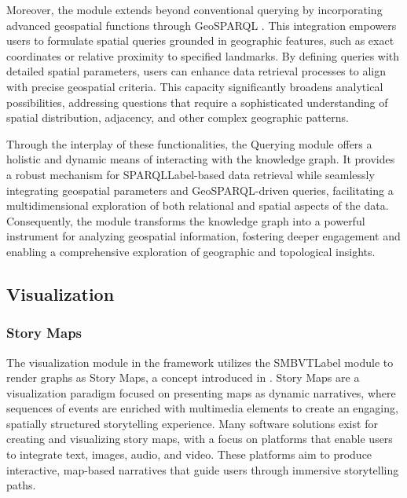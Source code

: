 Moreover, the module extends beyond conventional querying by incorporating advanced geospatial functions through GeoSPARQL \cite{matthewperryOGCGeoSPARQLGeographic2012}. This integration empowers users to formulate spatial queries grounded in geographic features, such as exact coordinates or relative proximity to specified landmarks. By defining queries with detailed spatial parameters, users can enhance data retrieval processes to align with precise geospatial criteria. This capacity significantly broadens analytical possibilities, addressing questions that require a sophisticated understanding of spatial distribution, adjacency, and other complex geographic patterns.

Through the interplay of these functionalities, the Querying module offers a holistic and dynamic means of interacting with the knowledge graph. It provides a robust mechanism for \acrshort{SPARQLLabel}-based data retrieval while seamlessly integrating geospatial parameters and GeoSPARQL-driven queries, facilitating a multidimensional exploration of both relational and spatial aspects of the data. Consequently, the module transforms the knowledge graph into a powerful instrument for analyzing geospatial information, fostering deeper engagement and enabling a comprehensive exploration of geographic and topological insights.


\subsection{Visualization}\label{VI-subsec:visualization}

\subsubsection{Story Maps}

The visualization module in the framework utilizes the \acrfull{SMBVTLabel} module to render graphs as Story Maps, a concept introduced in \cite{bartalesiWebToolCreate2023c, bartalesiUnstructuredTextsSemantic2023b}. Story Maps are a visualization paradigm focused on presenting maps as dynamic narratives, where sequences of events are enriched with multimedia elements to create an engaging, spatially structured storytelling experience. Many software solutions exist for creating and visualizing story maps, with a focus on platforms that enable users to integrate text, images, audio, and video. These platforms aim to produce interactive, map-based narratives that guide users through immersive storytelling paths.

